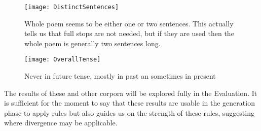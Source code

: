 \begin{figure}[t!]
\centering
\texttt{[image: DistinctSentences]}
\caption{Whole poem seems to be either one or two sentences. This actually tells us that full stops are not needed, but if they are used then the whole poem is generally two sentences long.}
\label{fig:distinct-sentences-chart}
\end{figure}

\begin{figure}[t!]
\centering
\texttt{[image: OverallTense]}
\caption{Never in future tense, mostly in past an sometimes in present}
\label{fig:overall-tense-chart}
\end{figure}

The results of these and other corpora will be explored fully in the Evaluation. It is sufficient for the moment to say that these results are usable in the generation phase to apply rules but also guides us on the strength of these rules, suggesting where divergence may be applicable.




